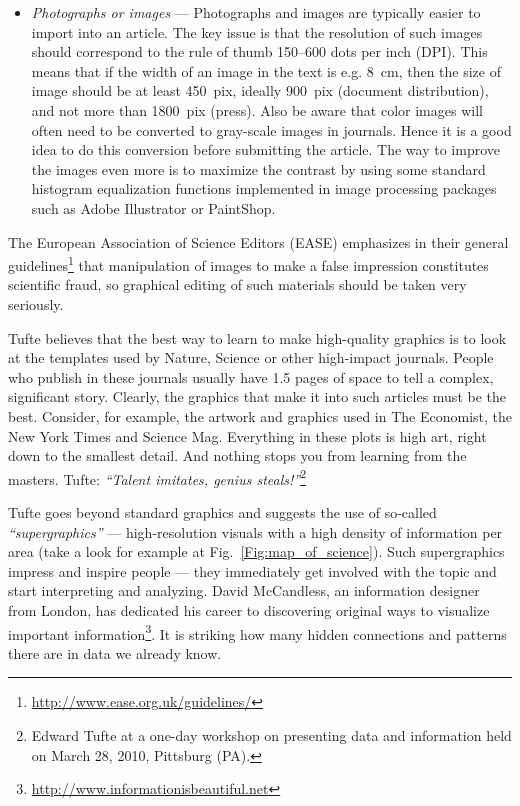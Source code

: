 \documentclass[graybox,envcountchap,sectrefs,UStrade]{svmono}
\begin{document}
\begin{itemize}
  \item \emph{Photographs or images} --- Photographs and images are typically easier to import into an article. The key issue is that the resolution of such images should correspond to the rule of thumb 150--600 dots per inch (DPI). This means that if the width of an image in the text is e.g. 8~cm, then the size of image should be at least 450~pix, ideally 900~pix (document distribution), and not more than 1800~pix (press). Also be aware that color images will often need to be converted to gray-scale images in journals. Hence it is a good idea to do this conversion before submitting the article. The way to improve the images even more is to maximize the contrast by using some standard histogram equalization functions implemented in image processing packages such as \textsf{Adobe Illustrator} or \textsf{PaintShop}.
\end{itemize}


The European Association of Science Editors (EASE) emphasizes in their general guidelines\footnote{\url{http://www.ease.org.uk/guidelines/}} that manipulation of images to make a false impression constitutes scientific fraud, so graphical editing of such materials should be taken very seriously.\par

Tufte believes that the best way to learn to make high-quality graphics is to look at the templates used by Nature, Science or other high-impact journals. People who publish in these journals usually have 1.5 pages of space to tell a complex, significant story. Clearly, the graphics that make it into such articles must be the best. Consider, for example, the artwork and graphics used in The Economist, the New York Times and Science Mag. Everything in these plots is high art, right down to the smallest detail. And nothing stops you from learning from the masters. Tufte: \emph{``Talent imitates, genius steals!''}\footnote{Edward Tufte at a one-day workshop on presenting data and information held on March 28, 2010, Pittsburg (PA).}\par

Tufte goes beyond standard graphics and suggests the use of so-called \emph{``supergraphics''} --- high-resolution visuals with a high density of information per area (take a look for example at Fig.\@~\ref{Fig:map_of_science}). Such supergraphics impress and inspire people --- they immediately get involved with the topic and start interpreting and analyzing. David McCandless, an information designer from London, has dedicated his career to discovering original ways to visualize important information\footnote{\url{http://www.informationisbeautiful.net}}. It is striking how many hidden connections and patterns there are in data we already know. \par
\end{document}
